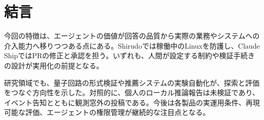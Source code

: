 \section{結言}
今回の特徴は、エージェントの価値が回答の品質から実際の業務やシステムへの介入能力へ移りつつある点にある。Shirudoでは稼働中のLinuxを防護し、Claude ShipではPRの修正と承認を担う。いずれも、人間が設定する制約や検証手続きの設計が実用化の前提となる。

研究領域でも、量子回路の形式検証や推薦システムの実験自動化が、探索と評価をつなぐ方向性を示した。対照的に、個人のローカル推論報告は未検証であり、イベント告知とともに観測窓外の投稿である。今後は各製品の実運用条件、再現可能な評価、エージェントの権限管理が継続的な注目点となる。
